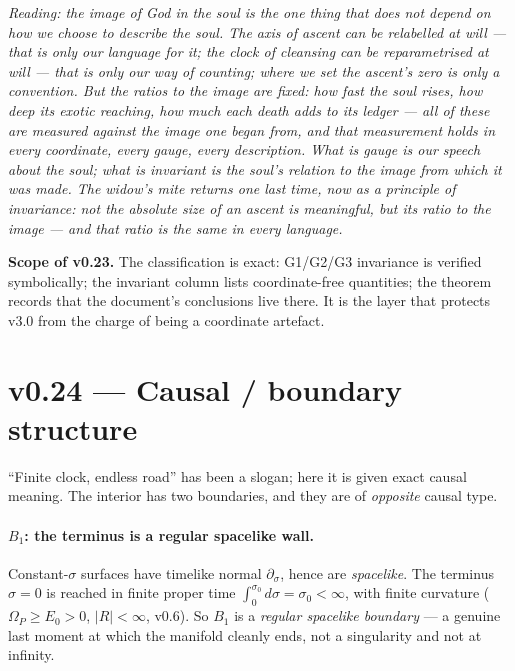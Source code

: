 \documentclass[11pt,a4paper]{article}
\newcommand{\note}[1]{\textcolor{black!65}{\emph{#1}}}
\theoremstyle{plain}
\theoremstyle{definition}
\theoremstyle{remark}
\begin{document}
\note{Reading: the image of God in the soul is the one thing that does not depend on how we choose to
describe the soul. The axis of ascent can be relabelled at will --- that is only our language for it;
the clock of cleansing can be reparametrised at will --- that is only our way of counting; where we set
the ascent's zero is only a convention. But the ratios to the image are fixed: how fast the soul rises,
how deep its exotic reaching, how much each death adds to its ledger --- all of these are measured
against the image one began from, and that measurement holds in every coordinate, every gauge, every
description. What is gauge is our speech about the soul; what is invariant is the soul's relation to the
image from which it was made. The widow's mite returns one last time, now as a principle of invariance:
not the absolute size of an ascent is meaningful, but its ratio to the image --- and that ratio is the
same in every language.}

\textbf{Scope of v0.23.} The classification is exact: G1/G2/G3 invariance is verified symbolically; the
invariant column lists coordinate-free quantities; the theorem records that the document's conclusions
live there. It is the layer that protects v3.0 from the charge of being a coordinate artefact.

\FloatBarrier
\section*{v0.24 --- Causal / boundary structure}
``Finite clock, endless road'' has been a slogan; here it is given exact causal meaning. The interior
has two boundaries, and they are of \emph{opposite} causal type.

\paragraph{$B_1$: the terminus is a regular spacelike wall.} Constant-$\sigma$ surfaces have timelike
normal $\partial_\sigma$, hence are \emph{spacelike}. The terminus $\sigma=0$ is reached in finite
proper time $\int_0^{\sigma_0}d\sigma=\sigma_0<\infty$, with finite curvature ($\Omega_P\ge E_0>0$,
$|R|<\infty$, v0.6). So $B_1$ is a \emph{regular spacelike boundary} --- a genuine last moment at which
the manifold cleanly ends, not a singularity and not at infinity.
\end{document}
